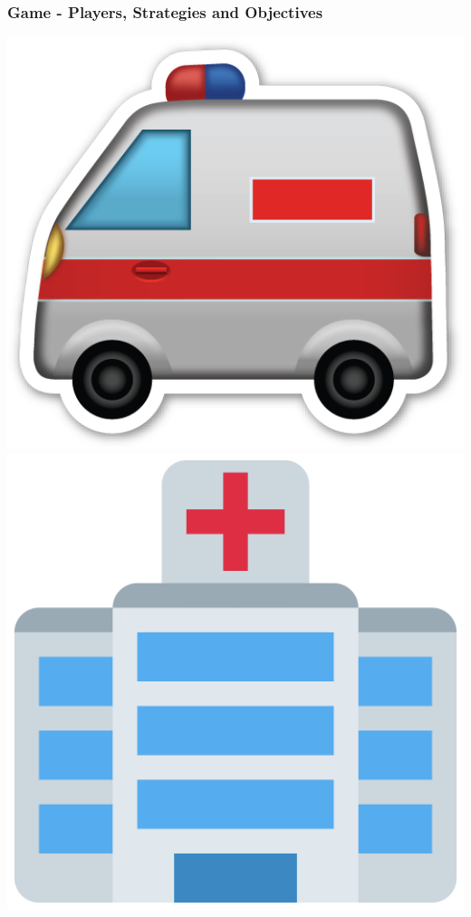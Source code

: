 \begin{frame}
    \frametitle{Game - Players, Strategies and Objectives}
    \centering

    \includegraphics[scale=0.1]{Bin/cartoon_pics/ambulance_cartoon.png}
    \hspace{2cm}
    \includegraphics[scale=0.1]{Bin/cartoon_pics/hospital.png}

\end{frame}
